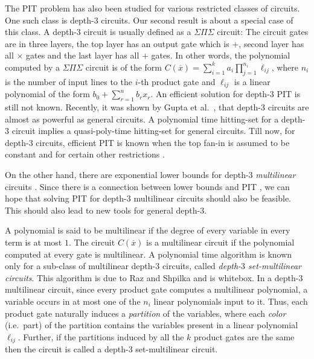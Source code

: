 \documentclass[final,oneeqnum, onethmnum, onefignum]{siamltex1213}
\renewcommand{\o}[1]{\overline{#1}}
\begin{document}
The PIT problem has also been studied for various restricted classes of circuits. 
One such class is depth-$3$ circuits. 
Our second result is about a special case of this class.
A depth-$3$ circuit is usually
defined as a $\Sigma \Pi \Sigma$ circuit: The circuit gates are in 
three layers, the top layer has an output gate which is $+$, second layer has
all $\times$ gates and the last layer has all $+$ gates. 
In other words, the polynomial computed by a $\Sigma\Pi\Sigma$ circuit is of the form 
$C(\overline{x}) = \sum_{i=1}^k a_i \prod_{j=1}^{n_i}  \ell_{ij}$, 
where $n_i$ is the number of input lines to the $i$-{th} product gate 
and $\ell_{ij}$ is a linear polynomial of the form $b_0 + \sum_{r=1}^n b_r x_r$.
An efficient solution for depth-$3$ PIT is still not known.
Recently, it was shown by Gupta et al.\ \cite{GKKS13}, that depth-3 circuits are almost as powerful as general circuits.
A polynomial time hitting-set for a depth-$3$ circuit implies a quasi-poly-time hitting-set for general circuits.
Till now, for depth-$3$ circuits, efficient PIT is known
when the top fan-in is assumed to be constant \cite{DS07, KS07, KS09, KS11, SS11, SS12, SS13}
and for certain other restrictions \cite{Sax08, SSS13, ASSS12}.

On the other hand, there are exponential lower bounds for depth-$3$ 
{\em multilinear} circuits \cite{RY09}. 
Since there is a connection between lower bounds and PIT \cite{Agr05}, 
we can hope that solving PIT for depth-$3$ multilinear circuits 
should also be feasible. 
This should also lead to new tools for general depth-$3$. 

A polynomial is said to be multilinear if 
the degree of every variable in every term is at most $1$.
The circuit $C(\o{x})$ is a multilinear circuit 
if the polynomial computed at every gate is multilinear.
A polynomial time algorithm is known only for a sub-class of multilinear 
depth-$3$ circuits, called {\em depth-$3$ set-multilinear circuits}.
This algorithm is due to Raz and Shpilka \cite{RS05} and is whitebox.
In a depth-$3$ multilinear circuit, 
since every product gate computes a multilinear polynomial, 
a variable occurs in at most one of the $n_i$ 
linear polynomials input to it. 
Thus, each product gate naturally induces a 
{\em partition} of the variables, where
each {\em color} (i.e.~part) of the partition contains the variables
present in a linear polynomial $\ell_{ij}$.  
Further, if the partitions induced by all the 
$k$ product gates are the same then the circuit is
called a depth-$3$ set-multilinear circuit.
\end{document}
